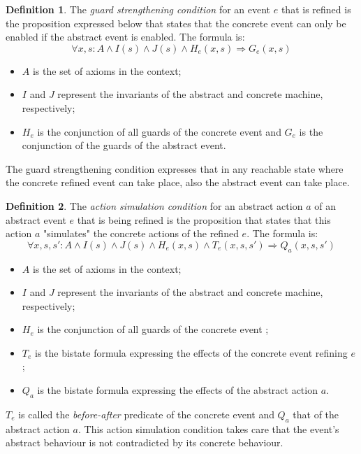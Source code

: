 \documentclass[10pt,a4paper]{article}
\theoremstyle{definition}
\newtheorem{definition}{Definition}[section]
\begin{document}
\begin{definition}
The \textit{guard strengthening condition} for an event $e$ that is refined is the proposition expressed below that states that the concrete event can only be enabled if the abstract event is enabled. The formula is: $$\forall x, s: A \land I(s) \land J(s) \land H_e(x,s) \Rightarrow G_e(x,s)$$

\begin{itemize}
	\item $A$ is the set of axioms in the context;
	\item $I$ and $J$ represent the invariants of the abstract and concrete machine, respectively;
	\item $H_e$ is the conjunction of all guards of the concrete event and $G_e$ is the conjunction of the guards of the abstract event.
\end{itemize}

The guard strengthening condition expresses that in any reachable state where the concrete refined event can take place, also the abstract event can take place.
\end{definition}


\begin{definition}
The \textit{action simulation condition} for an abstract action $a$ of an abstract event $e$ that is being refined is the proposition that states that this action $a$ "simulates" the concrete actions of the refined $e$. The formula is: $$\forall x, s, s': A \land I(s) \land J(s) \land H_e(x,s) \land T_e(x,s,s') \Rightarrow Q_a(x,s,s')$$

\begin{itemize}
	\item $A$ is the set of axioms in the context;
	\item $I$ and $J$ represent the invariants of the abstract and concrete machine, respectively;
	\item $H_e$ is the conjunction of all guards of the concrete event ;
	\item $T_e$ is the bistate formula expressing the effects of the concrete event refining $e$;
	\item $Q_a$ is the bistate formula expressing the effects of the abstract action $a$.
\end{itemize}

$T_e$ is called the \textit{before-after} predicate of the concrete event and $Q_a$ that of the abstract action $a$. This action simulation condition takes care that the event’s abstract behaviour is not contradicted by its concrete behaviour.
\end{definition}
\end{document}
